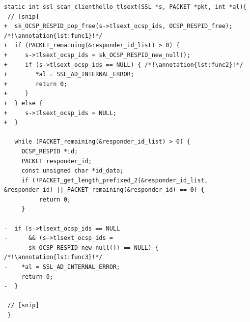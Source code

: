 \documentclass[10pt,conference]{IEEEtran}
\newcounter{lstannotation}
\renewcommand{\thelstannotation}{\ding{\number\numexpr181+\arabic{lstannotation}}}
\newcommand{\annotation}[1]{\refstepcounter{lstannotation}\label{#1}\thelstannotation}
\begin{document}


\medskip
\setcounter{lstannotation}{0}
\begin{lstlisting}[style={CStyle}, caption={Patch provided by OpenSSL developers to the
\\CVE-2016-6304 vulnerability on file ssl/t1\_lib.c},label={lst:vuln}]
static int ssl_scan_clienthello_tlsext(SSL *s, PACKET *pkt, int *al){ 
 // [snip]
+  sk_OCSP_RESPID_pop_free(s->tlsext_ocsp_ids, OCSP_RESPID_free); /*!\annotation{lst:func1}!*/
+  if (PACKET_remaining(&responder_id_list) > 0) { 
+     s->tlsext_ocsp_ids = sk_OCSP_RESPID_new_null();
+     if (s->tlsext_ocsp_ids == NULL) { /*!\annotation{lst:func2}!*/
+        *al = SSL_AD_INTERNAL_ERROR;
+        return 0;
+     }
+  } else {
+     s->tlsext_ocsp_ids = NULL;
+  }

   while (PACKET_remaining(&responder_id_list) > 0) {
     OCSP_RESPID *id;
     PACKET responder_id;
     const unsigned char *id_data;
     if (!PACKET_get_length_prefixed_2(&responder_id_list, &responder_id) || PACKET_remaining(&responder_id) == 0) {
          return 0;
     }

-  if (s->tlsext_ocsp_ids == NULL 
-      && (s->tlsext_ocsp_ids = 
-      sk_OCSP_RESPID_new_null()) == NULL) { /*!\annotation{lst:func3}!*/
-    *al = SSL_AD_INTERNAL_ERROR;
-    return 0;
-  }

 // [snip]
 }
\end{lstlisting}
\end{document}
